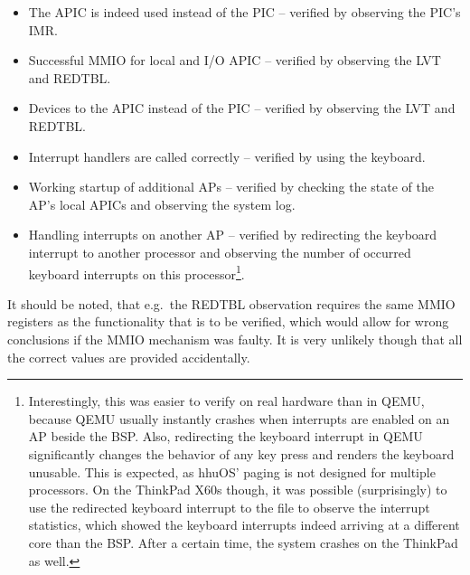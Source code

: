 \begin{itemize}
  \item The APIC is indeed used instead of the PIC -- verified by observing the PIC's IMR\@.
  \item Successful MMIO for local and I/O APIC -- verified by observing the LVT and REDTBL\@.
  \item Devices  to the APIC instead of the PIC -- verified by observing the LVT and REDTBL\@.
  \item Interrupt handlers are called correctly -- verified by using the keyboard.
  \item Working startup of additional APs -- verified by checking the state of the AP's local APICs and observing the system log.
  \item Handling interrupts on another AP -- verified by redirecting the keyboard interrupt to another processor and observing the number of occurred keyboard interrupts on this processor\footnote{
          Interestingly, this was easier to verify on real hardware than in QEMU, because QEMU usually instantly crashes when interrupts are enabled on an AP beside the BSP\@.
          Also, redirecting the keyboard interrupt in QEMU significantly changes the behavior of any key press and renders the keyboard unusable.
          This is expected, as hhuOS' paging is not designed for multiple processors.
          On the ThinkPad X60s though, it was possible (surprisingly) to use the redirected keyboard interrupt to  the  file to observe the interrupt statistics, which showed the keyboard interrupts indeed arriving at a different core than the BSP\@.
          After a certain time, the system crashes on the ThinkPad as well.}.
\end{itemize}

It should be noted, that e.g.\ the REDTBL observation requires the same MMIO registers as the functionality that is to be verified, which would allow for wrong conclusions if the MMIO mechanism was faulty.
It is very unlikely though that all the correct values are provided accidentally.

\cleardoublepage